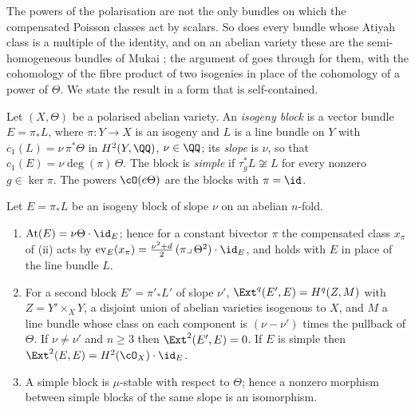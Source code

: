 The powers of the polarisation are not the only bundles on which the
compensated Poisson classes act by scalars. So does every bundle whose Atiyah
class is a multiple of the identity, and on an abelian variety these are the
semi-homogeneous bundles of Mukai \cite{Muk78}; the argument of
 goes through for them, with the cohomology of the fibre
product of two isogenies in place of the cohomology of a power of $\Theta$.
We state the result in a form that is self-contained.

\begin{definition}\label{def:block}
Let $(X,\Theta)$ be a polarised abelian variety. An \emph{isogeny block} is a
vector bundle $E=\pi_{*}L$, where $\pi\colon Y\to X$ is an isogeny and $L$ is
a line bundle on $Y$ with $c_{1}(L)=\nu\,\pi^{*}\Theta$ in $H^{2}(Y,\QQ)$,
$\nu\in\QQ$; its \emph{slope} is $\nu$, so that $c_{1}(E)=\nu\deg(\pi)\,\Theta$.
The block is \emph{simple} if $\tau_{g}^{*}L\not\cong L$ for every nonzero
$g\in\ker\pi$. The powers $\cO(e\Theta)$ are the blocks with $\pi=\id$.
\end{definition}

\begin{lemma}\label{lem:blocks}
Let $E=\pi_{*}L$ be an isogeny block of slope $\nu$ on an abelian $n$-fold.
\begin{enumerate}[label=\textup{(\roman*)},nosep]
\item $\mathrm{At}(E)=\nu\Theta\cdot\id_{E}$; hence for a constant bivector
  $\pi$ the compensated class $x_{\pi}$ of (ii) acts by
  $\operatorname{ev}_{E}(x_{\pi})=\tfrac{\nu^{2}+d}{2}\,(\pi\lrcorner\,\Theta^{2})\cdot\id_{E}$,
  and  holds with $E$ in place of the line bundle $L$.
\item For a second block $E'=\pi'_{*}L'$ of slope $\nu'$,
  $\Ext^{q}(E',E)=H^{q}(Z,M)$ with $Z=Y'\times_{X}Y$, a disjoint union of
  abelian varieties isogenous to $X$, and $M$ a line bundle whose class on
  each component is $(\nu-\nu')$ times the pullback of $\Theta$. If
  $\nu\ne\nu'$ and $n\ge3$ then $\Ext^{2}(E',E)=0$. If $E$ is simple then
  $\Ext^{2}(E,E)=H^{2}(\cO_{X})\cdot\id_{E}$.
\item A simple block is $\mu$-stable with respect to $\Theta$; hence a
  nonzero morphism between simple blocks of the same slope is an
  isomorphism.
\end{enumerate}
\end{lemma}

